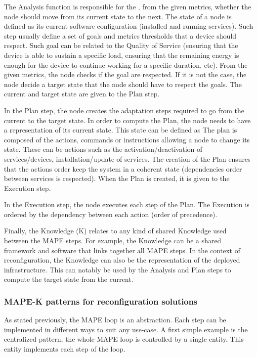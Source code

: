 \documentclass{article}
\begin{document}
The Analysis function is responsible for the , from the given metrics, whether the node should move from its current state to the next. The state of a node is defined as its current software configuration (\eg installed and running services). Such step usually define a set of goals and metrics thresholds that a device should respect. Such goal can be related to the Quality of Service (\eg ensuring that the device is able to sustain a specific load, ensuring that the remaining energy is enough for the device to continue working for a specific duration, etc). From the given metrics, the node checks if the goal are respected. If it is not the case, the node decide a target state that the node should have to respect the goals. The current and target state are given to the Plan step. 

In the Plan step, the node creates the adaptation steps required to go from the current to the target state. In order to compute the Plan, the node needs to have a representation of its current state. This state can be defined as  The plan is composed of the actions, commands or instructions allowing a node to change its state. These can be actions such as the activation/deactivation of services/devices, installation/update of services. The creation of the Plan ensures that the actions order keep the system in a coherent state (\eg dependencies order between services is respected). When the Plan is created, it is given to the Execution step.

In the Execution step, the node executes each step of the Plan. The Execution is ordered by the dependency between each action (\eg order of precedence). 

Finally, the Knowledge (K) relates to any kind of shared Knowledge used between the MAPE steps. For example, the Knowledge can be a shared framework and software that links together all MAPE steps. In the context of reconfiguration, the Knowledge can also be the representation of the deployed infrastructure. This can notably be used by the Analysis and Plan steps to compute the target state from the current. 

\subsubsection{MAPE-K patterns for reconfiguration solutions}
As stated previously, the MAPE loop is an abstraction. Each step can be implemented in different ways to suit any use-case. A first simple example is the centralized pattern, the whole MAPE loop is controlled by a single entity. This entity implements each step of the loop.




\end{document}
